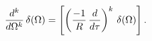 \begin{equation}
{d^{k} \over d\Omega^{k}}\, \delta (\Omega)=
\left[\left({-1 \over R}\,{d \over d\tau} \right)^{k}\,\delta (\Omega) 
\right].
\end{equation}

